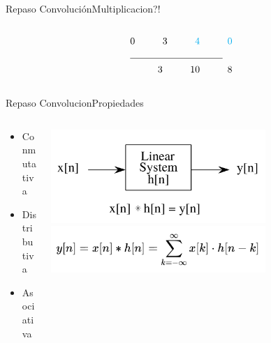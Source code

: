 \begin{frame}{Repaso Convolución}{Multiplicacion?!}
\begin{columns}[t]
\begin{column}{.3\textwidth}
\begin{align*}
               0\hspace{1cm} 3\hspace{1cm}\textcolor{cyan}{4}\hspace{1cm}\textcolor{cyan} {0}\\
               \cline{1-2}
               3 \hspace{1cm} 10 \hspace{1cm} 8\\
            \end{align*}
      \end{column}
      \hspace{2pt}
   \end{columns}
   \vfill
\end{frame}
\begin{frame}{Repaso Convolucion}{Propiedades}
   \begin{columns}[c]
      \hspace{5pt}
      \begin{column}{.2\textwidth}
         \begin{itemize}
            \item{Conmutativa}
            \item{Distributiva}
            \item{Asociativa}
         \end{itemize}
      \end{column}
      \hspace{2pt}
      \vrule
      \hspace{2pt}
      \begin{column}{.8\textwidth}
         \centering\includegraphics[width=0.7\textwidth]{4_clase/entrada_conv_h}\\
         \centering\includegraphics[width=0.7\textwidth]{4_clase/convolucion_eq}
      \end{column}
      \hspace{2pt}
   \end{columns}
   \vfill
\end{frame}
